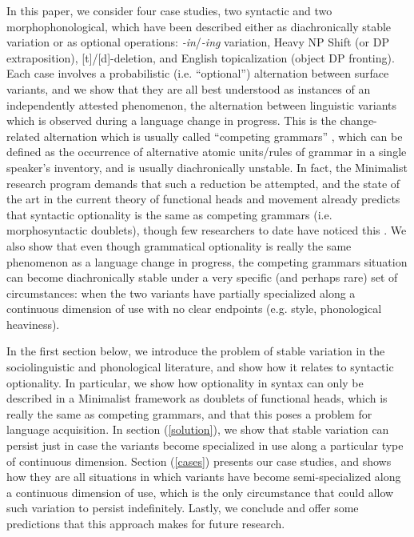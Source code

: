 In this paper, we consider four case studies, two syntactic and two morphophonological, which have been described either as diachronically stable variation or as optional operations: \textsl{-in}/\textsl{-ing} variation, Heavy NP Shift (or DP extraposition), [t]/[d]-deletion, and English topicalization (object DP fronting).
Each case involves a probabilistic (i.e. ``optional'') alternation between surface variants, and we show that they are all best understood as instances of an independently attested phenomenon, the alternation between linguistic variants which is observed during a language change in progress.
This is the change-related alternation which is usually called ``competing grammars'' \citep[][]{kroch1989}, which can be defined as the occurrence of alternative atomic units/rules of grammar in a single speaker's inventory, and is usually diachronically unstable.
In fact, the Minimalist research program demands that such a reduction be attempted, and the state of the art in the current  theory of functional heads and movement already predicts that syntactic optionality is the same as competing grammars (i.e. morphosyntactic doublets), though few researchers to date have noticed this \citep[with the exception of][]{kroch1994}.
We also show that even though grammatical optionality is really the same phenomenon as a language change in progress, the competing grammars situation can become diachronically stable under a very specific (and perhaps rare) set of circumstances: when the two variants have partially specialized along a continuous dimension of use with no clear endpoints (e.g. style, phonological heaviness).
  
In the first section below, we introduce the problem of stable variation in the sociolinguistic and phonological literature, and show how it relates to syntactic optionality.
In particular, we show how optionality in syntax can only be described in a Minimalist framework as doublets of functional heads, which is really the same as competing grammars, and that this poses a problem for language acquisition.
In section (\ref{solution}), we show that stable variation can persist just in case the variants become specialized in use along a particular type of continuous dimension.
Section (\ref{cases}) presents our case studies, and shows how they are all situations in which variants have become semi-specialized along a continuous dimension of use, which is the only circumstance that could allow such variation to persist indefinitely.
Lastly, we conclude and offer some predictions that this approach makes for future research.


